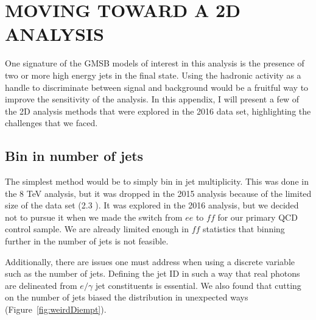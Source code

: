 \chapter{MOVING TOWARD A 2D ANALYSIS}
\label{app:2D}

One signature of the GMSB models of interest in this analysis
is the presence of two or more high energy jets in the final state.
Using the hadronic activity as a handle to discriminate between signal and background
would be a fruitful way to improve the sensitivity of the analysis. 
In this appendix, I will present a few of the 2D analysis methods
that were explored in the 2016 data set, highlighting the challenges 
that we faced. 

\section{Bin in number of jets}
The simplest method would be to simply bin in jet multiplicity.
This was done in the 8 TeV analysis, but it was dropped in the 
2015 analysis because of the limited size of the data set (2.3 \fbinv).
It was explored in the 2016 analysis, but we decided not 
to pursue it when we made the switch from $ee$ to $ff$ for our 
primary QCD control sample. We are 
already limited enough in $ff$ statistics that binning further 
in the number of jets is not feasible. 

Additionally, there are issues one must address when using 
a discrete variable such as the number of jets. Defining the 
jet ID in such a way that real photons are delineated from 
$e/\gamma$ jet constituents is essential. We also found
that cutting on the number of jets biased the \diempt distribution
in unexpected ways (Figure~\ref{fig:weirdDiempt}).

